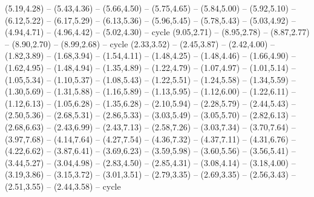 {  (5.19,4.28) -- (5.43,4.36) -- (5.66,4.50) -- (5.75,4.65) -- (5.84,5.00) -- (5.92,5.10) -- (6.12,5.22) -- (6.17,5.29) -- (6.13,5.36) -- (5.96,5.45) -- (5.78,5.43) -- (5.03,4.92) -- (4.94,4.71) -- (4.96,4.42) -- (5.02,4.30) -- cycle
  (9.05,2.71) -- (8.95,2.78) -- (8.87,2.77) -- (8.90,2.70) -- (8.99,2.68) -- cycle
  (2.33,3.52) -- (2.45,3.87) -- (2.42,4.00) -- (1.82,3.89) -- (1.68,3.94) -- (1.54,4.11) -- (1.48,4.25) -- (1.48,4.46) -- (1.66,4.90) -- (1.62,4.95) -- (1.48,4.94) -- (1.35,4.89) -- (1.22,4.79) -- (1.07,4.97) -- (1.01,5.14) -- (1.05,5.34) -- (1.10,5.37) -- (1.08,5.43) -- (1.22,5.51) -- (1.24,5.58) -- (1.34,5.59) -- (1.30,5.69) -- (1.31,5.88) -- (1.16,5.89) -- (1.13,5.95) -- (1.12,6.00) -- (1.22,6.11) -- (1.12,6.13) -- (1.05,6.28) -- (1.35,6.28) -- (2.10,5.94) -- (2.28,5.79) -- (2.44,5.43) -- (2.50,5.36) -- (2.68,5.31) -- (2.86,5.33) -- (3.03,5.49) -- (3.05,5.70) -- (2.82,6.13) -- (2.68,6.63) -- (2.43,6.99) -- (2.43,7.13) -- (2.58,7.26) -- (3.03,7.34) -- (3.70,7.64) -- (3.97,7.68) -- (4.14,7.64) -- (4.27,7.54) -- (4.36,7.32) -- (4.37,7.11) -- (4.31,6.76) -- (4.22,6.62) -- (3.87,6.41) -- (3.69,6.23) -- (3.59,5.98) -- (3.60,5.56) -- (3.56,5.41) -- (3.44,5.27) -- (3.04,4.98) -- (2.83,4.50) -- (2.85,4.31) -- (3.08,4.14) -- (3.18,4.00) -- (3.19,3.86) -- (3.15,3.72) -- (3.01,3.51) -- (2.79,3.35) -- (2.69,3.35) -- (2.56,3.43) -- (2.51,3.55) -- (2.44,3.58) -- cycle}
